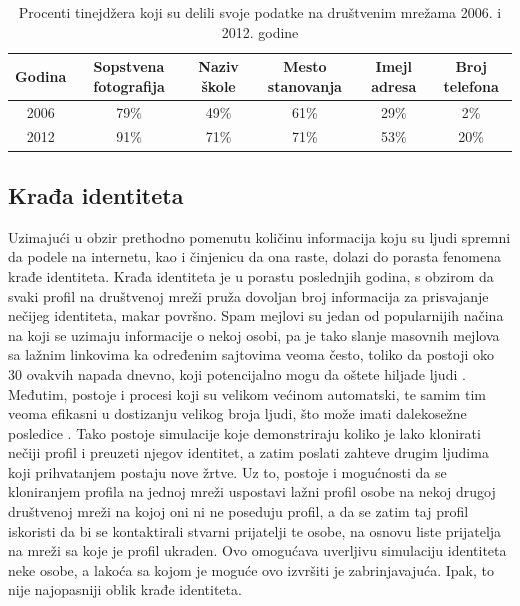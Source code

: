 \documentclass[a4paper]{article}
\begin{document}
\begin{table}[h!]
	\begin{center}
		\caption{Procenti tinejdžera koji su delili svoje podatke na društvenim mrežama 2006. i 2012. godine}
		\begin{tabular}{|c | c c c c c|} \hline
			Godina & Sopstvena fotografija & Naziv škole & Mesto stanovanja & Imejl adresa & Broj telefona \\
			\hline
			2006 & 79\% & 49\% & 61\% & 29\% & 2\% \\
			2012 & 91\% & 71\% & 71\% & 53\% & 20\%\\
			\hline
		\end{tabular}
		\label{tab:tabela1}
	\end{center}
\end{table}

\subsection{Krađa identiteta}
Uzimajući u obzir prethodno pomenutu količinu informacija koju su ljudi spremni da podele na internetu, kao i činjenicu da ona raste, dolazi do porasta fenomena krađe identiteta. Krađa identiteta je u porastu poslednjih godina, s obzirom da svaki profil na društvenoj mreži pruža dovoljan broj informacija za prisvajanje nečijeg identiteta, makar površno. Spam mejlovi su jedan od popularnijih načina na koji se uzimaju informacije o nekoj osobi, pa je tako slanje masovnih mejlova sa lažnim linkovima ka određenim sajtovima veoma često, toliko da postoji oko 30 ovakvih napada dnevno, koji potencijalno mogu da oštete hiljade ljudi \cite{it1}. Međutim, postoje i procesi koji su velikom većinom automatski, te samim tim veoma efikasni u dostizanju velikog broja ljudi, što može imati dalekosežne posledice \cite{it2}. Tako postoje simulacije koje demonstriraju koliko je lako klonirati nečiji profil i preuzeti njegov identitet, a zatim poslati zahteve drugim ljudima koji prihvatanjem postaju nove žrtve. Uz to, postoje i mogućnosti da se kloniranjem profila na jednoj mreži uspostavi lažni profil osobe na nekoj drugoj društvenoj mreži na kojoj oni ni ne poseduju profil, a da se zatim taj profil iskoristi da bi se kontaktirali stvarni prijatelji te osobe, na osnovu liste prijatelja na mreži sa koje je profil ukraden. Ovo omogućava uverljivu simulaciju identiteta neke osobe, a lakoća sa kojom je moguće ovo izvršiti je zabrinjavajuća. Ipak, to nije najopasniji oblik krađe identiteta.
\end{document}
